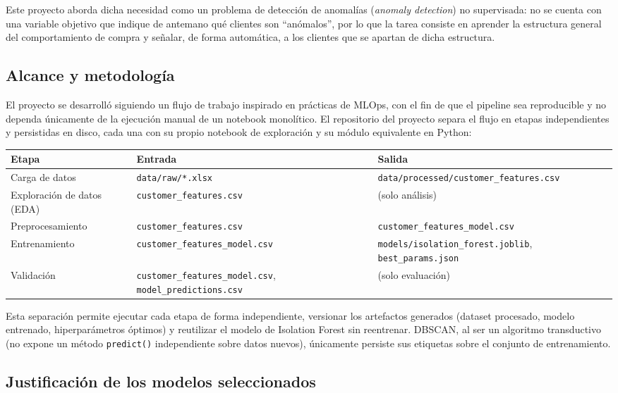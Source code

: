 \documentclass[11pt]{article}
\begin{document}
Este proyecto aborda dicha necesidad como un problema de detección de anomalías (\textit{anomaly detection})
no supervisada: no se cuenta con una variable objetivo que indique de antemano qué clientes son
``anómalos'', por lo que la tarea consiste en aprender la estructura general del comportamiento de compra
y señalar, de forma automática, a los clientes que se apartan de dicha estructura.

\subsection*{Alcance y metodología}

El proyecto se desarrolló siguiendo un flujo de trabajo inspirado en prácticas de MLOps, con el fin de que
el pipeline sea reproducible y no dependa únicamente de la ejecución manual de un notebook monolítico.
El repositorio del proyecto separa el flujo en etapas independientes y persistidas en disco, cada una con
su propio notebook de exploración y su módulo equivalente en Python:

\begin{longtable}{L{3.2cm}L{5cm}L{6cm}}
\toprule
\textbf{Etapa} & \textbf{Entrada} & \textbf{Salida} \\
\midrule
\endhead
Carga de datos & \texttt{data/raw/*.xlsx} & \texttt{data/processed/customer\_features.csv} \\
Exploración de datos (EDA) & \texttt{customer\_features.csv} & (solo análisis) \\
Preprocesamiento & \texttt{customer\_features.csv} & \texttt{customer\_features\_model.csv} \\
Entrenamiento & \texttt{customer\_features\_model.csv} & \texttt{models/isolation\_forest.joblib}, \texttt{best\_params.json} \\
Validación & \texttt{customer\_features\_model.csv}, \texttt{model\_predictions.csv} & (solo evaluación) \\
\bottomrule
\end{longtable}

Esta separación permite ejecutar cada etapa de forma independiente, versionar los artefactos generados
(dataset procesado, modelo entrenado, hiperparámetros óptimos) y reutilizar el modelo de Isolation
Forest sin reentrenar. DBSCAN, al ser un algoritmo transductivo (no expone un método \texttt{predict()}
independiente sobre datos nuevos), únicamente persiste sus etiquetas sobre el conjunto de
entrenamiento.

\subsection*{Justificación de los modelos seleccionados}
\end{document}
